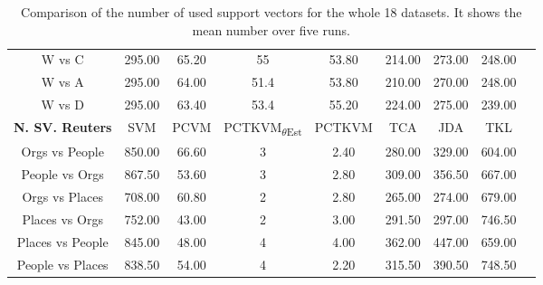 \begin{table}[]
{\begin{tabular}{@{}ccccccccc@{}}
			W vs C                           & 295.00  & 65.20  & 55                                   & 53.80  & 214.00 & 273.00 & 248.00 \\
			W vs A                           & 295.00  & 64.00  & 51.4                                   & 53.80  & 210.00 & 270.00 & 248.00 \\
			W vs D                           & 295.00  & 63.40  & 53.4                                   & 55.20  & 224.00 & 275.00 & 239.00 \\ \midrule
			\textbf{N. SV. Reuters}        & SVM     & PCVM   & PCTKVM\textsubscript{$\theta$Est} & PCTKVM & TCA    & JDA   & TKL    \\ \midrule
			Orgs vs People                   & 850.00  & 66.60  & 3                                  & 2.40   & 280.00 & 329.00 & 604.00 \\
			People vs Orgs                   & 867.50  & 53.60  & 3                                  & 2.80   & 309.00 & 356.50 & 667.00 \\
			Orgs vs Places                   & 708.00  & 60.80  & 2                                  & 2.80   & 265.00 & 274.00 & 679.00 \\
			Places vs Orgs                   & 752.00  & 43.00  & 2                                  & 3.00   & 291.50 & 297.00 & 746.50 \\
			Places vs People                 & 845.00  & 48.00  & 4                                  & 4.00   & 362.00 & 447.00 & 659.00 \\
			People vs Places                 & 838.50  & 54.00  & 4                                  & 2.20   & 315.50 & 390.50 & 748.50 \\ \bottomrule
	\end{tabular}}
	\caption[Complete number of used support vectors]{Comparison of the number of used support vectors for the whole 18 datasets. It shows the mean number over five runs.\label{BTableCompleteNvec}}
\end{table}

